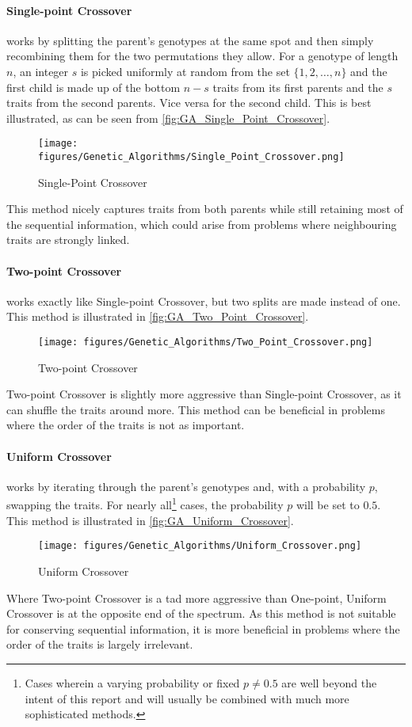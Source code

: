 \paragraph{Single-point Crossover} works by splitting the parent's genotypes at the same spot and then simply recombining them for the two permutations they allow. For a genotype of length $n$, an integer $s$ is picked uniformly at random from the set $\{1, 2, \hdots, n\}$ and the first child is made up of the bottom $n - s$ traits from its first parents and the $s$ traits from the second parents. Vice versa for the second child. This is best illustrated, as can be seen from \autoref{fig:GA_Single_Point_Crossover}.
\begin{figure}[H]
    \centering
    \texttt{[image: figures/Genetic\_Algorithms/Single\_Point\_Crossover.png]}
    \caption{Single-Point Crossover}
    \small
    \raggedright
    \label{fig:GA_Single_Point_Crossover}
\end{figure}
This method nicely captures traits from both parents while still retaining most of the sequential information, which could arise from problems where neighbouring traits are strongly linked.

\paragraph{Two-point Crossover} works exactly like Single-point Crossover, but two splits are made instead of one. This method is illustrated in \autoref{fig:GA_Two_Point_Crossover}.
\begin{figure}[H]
    \centering
    \texttt{[image: figures/Genetic\_Algorithms/Two\_Point\_Crossover.png]}
    \caption{Two-point Crossover}
    \small
    \raggedright
    \label{fig:GA_Two_Point_Crossover}
\end{figure}
Two-point Crossover is slightly more aggressive than Single-point Crossover, as it can shuffle the traits around more. This method can be beneficial in problems where the order of the traits is not as important.

\paragraph{Uniform Crossover} works by iterating through the parent's genotypes and, with a probability $p$, swapping the traits. For nearly all\footnote{Cases wherein a varying probability or fixed $p \neq 0.5$ are well beyond the intent of this report and will usually be combined with much more sophisticated methods.} cases, the probability $p$ will be set to $0.5$. This method is illustrated in \autoref{fig:GA_Uniform_Crossover}.
\begin{figure}[H]
    \centering
    \texttt{[image: figures/Genetic\_Algorithms/Uniform\_Crossover.png]}
    \caption{Uniform Crossover}
    \small
    \raggedright
    \label{fig:GA_Uniform_Crossover}
\end{figure}
Where Two-point Crossover is a tad more aggressive than One-point, Uniform Crossover is at the opposite end of the spectrum. As this method is not suitable for conserving sequential information, it is more beneficial in problems where the order of the traits is largely irrelevant.

